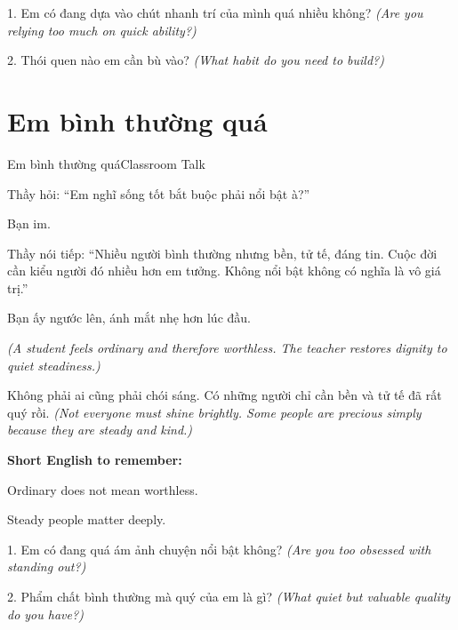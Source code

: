 \begin{tuhocnhanh}
1. Em có đang dựa vào chút nhanh trí của mình quá nhiều không? \textit{(Are you relying too much on quick ability?)}

2. Thói quen nào em cần bù vào? \textit{(What habit do you need to build?)}
\end{tuhocnhanh}
\ngancach

\section{Em bình thường quá}
\begin{truyen}{Em bình thường quá}{Classroom Talk}

Thầy hỏi: ``Em nghĩ sống tốt bắt buộc phải nổi bật à?''

Bạn im.

Thầy nói tiếp: ``Nhiều người bình thường nhưng bền, tử tế, đáng tin. Cuộc đời cần kiểu người đó nhiều hơn em tưởng. Không nổi bật không có nghĩa là vô giá trị.''

Bạn ấy ngước lên, ánh mắt nhẹ hơn lúc đầu.

\textit{(A student feels ordinary and therefore worthless. The teacher restores dignity to quiet steadiness.)}
\end{truyen}

\begin{baihoc}
Không phải ai cũng phải chói sáng. Có những người chỉ cần bền và tử tế đã rất quý rồi.
\textit{(Not everyone must shine brightly. Some people are precious simply because they are steady and kind.)}
\end{baihoc}

\begin{ghinhoanh}
\textbf{Short English to remember:}

Ordinary does not mean worthless.

Steady people matter deeply.
\end{ghinhoanh}

\begin{tuhocnhanh}
1. Em có đang quá ám ảnh chuyện nổi bật không? \textit{(Are you too obsessed with standing out?)}

2. Phẩm chất bình thường mà quý của em là gì? \textit{(What quiet but valuable quality do you have?)}
\end{tuhocnhanh}
\ngancach

